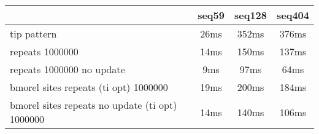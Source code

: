 \begin{tabular}{|l|c|c|c|}
\hline
 & seq59 & seq128 & seq404  \\
\hline
tip pattern &  26ms &  352ms &  376ms\\
\hline
repeats 1000000 &  14ms &  150ms &  137ms\\
\hline
repeats 1000000 no update &  9ms &  97ms &  64ms\\
\hline
bmorel sites repeats (ti opt) 1000000 &  19ms &  200ms &  184ms\\
\hline
bmorel sites repeats no update (ti opt) 1000000 &  14ms &  140ms &  106ms\\
\hline
\end{tabular}
